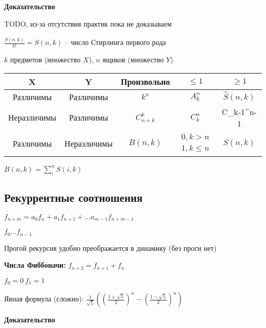 \documentclass[14pt, letter paper]{article}
\begin{document}
\begin{center}
    \textbf{Доказательство}
\end{center}

TODO, из-за отсутствия практик пока не доказываем

$\frac{\hat{S}(n,k)}{k!} = S(n,k)$ -- число Стирлинга первого рода

$k$ предметов (множество $X$), $n$ ящиков (множество $Y$)

\begin{center}
    \begin{tabular}{|c|c|c|c|c|}
        \hline
        X & Y & Произвольно & $\leq 1$ & $\geq 1$ \\
        \hline
        Различимы & Различимы & $k^n$ & $A_k^n$ & $\hat{S}(n, k)$ \\
        \hline
        Неразличимы & Различимы & $C_{n+k}^k$ & $C_k^n$ & C_{k-1}^{n-1} \\
        \hline
        Различимы & Неразличимы & $B(n, k)$ & $\begin{gathered} 0, k > n \\ 1, k \leq n \end{gathered}$ & $S(n, k)$ \\
        \hline
    \end{tabular}
\end{center}

$B(n, k) = \sum\limits_i^n S(i, k)$

\begin{center}
    \section*{Рекуррентные соотношения}
\end{center}

$f_{n+m} = a_0f_n + a_1f_{n+1} + \ldots a_{m-1}f_{n+m-1}$

$f_0 \ldots f_{n-1}$

Прогой рекурсия удобно преображается в динамику (без проги нет)

\vspace{5mm}

\textbf{Числа Фиббоначи:} $f_{n+2} = f_{n+1} + f_n$

$f_0 = 0\ f_1 = 1$

Явная формула (сложно): $\frac{1}{\sqrt{5}}((\frac{1 + \sqrt{5}}{2})^n - (\frac{1 - \sqrt{5}}{2})^n)$

\begin{center}
    \textbf{Доказательство}
\end{center}
\end{document}
